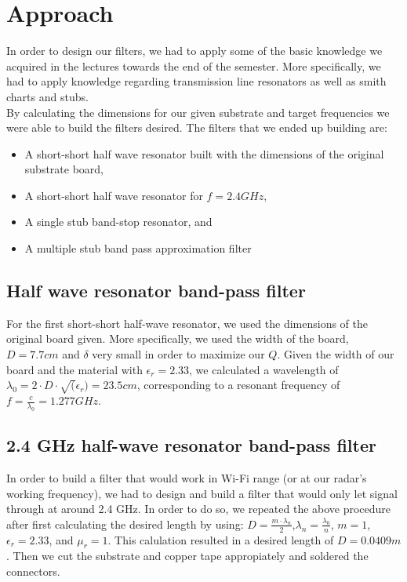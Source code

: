 \documentclass[letterpaper, 11pt, twocolumn]{article}
\begin{document}
\section{Approach}
In order to design our filters, we had to apply some of the basic knowledge we acquired in the lectures towards the end of the semester. More specifically, we had to apply knowledge regarding transmission line resonators as well as smith charts and stubs.
\\
By calculating the dimensions for our given substrate and target frequencies we were able to build the filters desired. The filters that we ended up building are:
\begin{itemize}
    \item A short-short half wave resonator built with the dimensions of the original substrate board,
    \item A short-short half wave resonator for $f=2.4 GHz$,
    \item A single stub band-stop resonator, and
    \item A multiple stub band pass approximation filter
\end{itemize}
\subsection{Half wave resonator band-pass filter}
For the first short-short half-wave resonator, we used the dimensions of the original board given. More specifically, we used the width of the board, $D=7.7cm$ and $\delta$ very small in order to maximize our $Q$. Given the width of our board and the material with $\epsilon_r=2.33$, we calculated a wavelength of \(\lambda_0=2\cdot D \cdot\sqrt(\epsilon_r)=23.5cm\), corresponding to a resonant frequency of $f=\frac{c}{\lambda_0}=1.277GHz$.

\subsection{2.4 GHz half-wave resonator band-pass filter}
In order to build a filter that would work in Wi-Fi range (or at our radar's working frequency), we had to design and build a filter that would only let signal through at around 2.4 GHz. In order to do so, we repeated the above procedure after first calculating the desired length by using: \(D=\frac{m\cdot\lambda_n}{2}\),\(\lambda_n=\frac{\lambda_0}{n}\), \(m=1\),\(\epsilon_r=2.33\), and \(\mu_r=1\). This calulation resulted in a desired length of \(D=0.0409m\). Then we cut the substrate and copper tape appropiately and soldered the connectors. 
\end{document}
